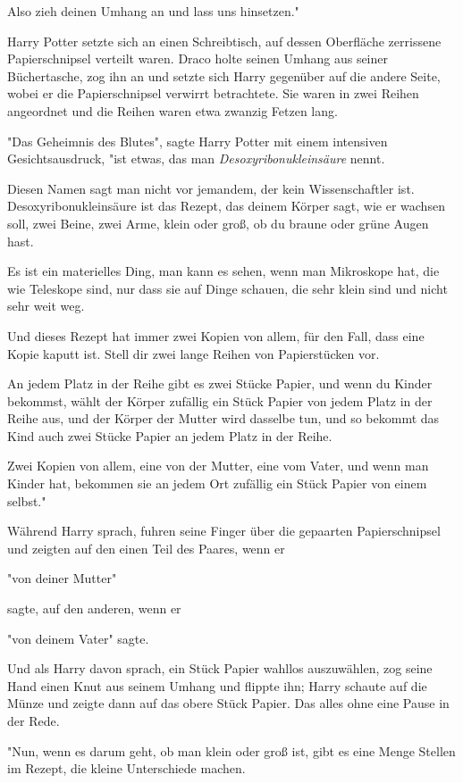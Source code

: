 {Also zieh deinen Umhang an und lass uns hinsetzen."

Harry Potter setzte sich an einen Schreibtisch, auf dessen Oberfläche zerrissene Papierschnipsel verteilt waren. Draco holte seinen Umhang aus seiner Büchertasche, zog ihn an und setzte sich Harry gegenüber auf die andere Seite, wobei er die Papierschnipsel verwirrt betrachtete. Sie waren in zwei Reihen angeordnet und die Reihen waren etwa zwanzig Fetzen lang.

"Das Geheimnis des Blutes", sagte Harry Potter mit einem intensiven Gesichtsausdruck, "ist etwas, das man \emph{Desoxyribonukleinsäure} nennt.

Diesen Namen sagt man nicht vor jemandem, der kein Wissenschaftler ist. Desoxyribonukleinsäure ist das Rezept, das deinem Körper sagt, wie er wachsen soll, zwei Beine, zwei Arme, klein oder groß, ob du braune oder grüne Augen hast.

Es ist ein materielles Ding, man kann es sehen, wenn man Mikroskope hat, die wie Teleskope sind, nur dass sie auf Dinge schauen, die sehr klein sind und nicht sehr weit weg.

Und dieses Rezept hat immer zwei Kopien von allem, für den Fall, dass eine Kopie kaputt ist. Stell dir zwei lange Reihen von Papierstücken vor.

An jedem Platz in der Reihe gibt es zwei Stücke Papier, und wenn du Kinder bekommst, wählt der Körper zufällig ein Stück Papier von jedem Platz in der Reihe aus, und der Körper der Mutter wird dasselbe tun, und so bekommt das Kind auch zwei Stücke Papier an jedem Platz in der Reihe.

Zwei Kopien von allem, eine von der Mutter, eine vom Vater, und wenn man Kinder hat, bekommen sie an jedem Ort zufällig ein Stück Papier von einem selbst."

Während Harry sprach, fuhren seine Finger über die gepaarten Papierschnipsel und zeigten auf den einen Teil des Paares, wenn er

"von deiner Mutter"

sagte, auf den anderen, wenn er

"von deinem Vater" sagte.

Und als Harry davon sprach, ein Stück Papier wahllos auszuwählen, zog seine Hand einen Knut aus seinem Umhang und flippte ihn; Harry schaute auf die Münze und zeigte dann auf das obere Stück Papier. Das alles ohne eine Pause in der Rede.

"Nun, wenn es darum geht, ob man klein oder groß ist, gibt es eine Menge Stellen im Rezept, die kleine Unterschiede machen.

}
